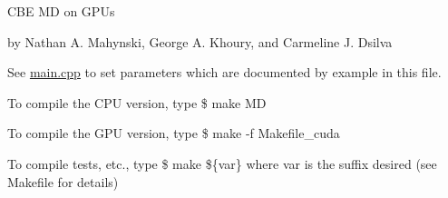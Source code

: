 C\-B\-E M\-D on G\-P\-Us

by Nathan A. Mahynski, George A. Khoury, and Carmeline J. Dsilva

See \hyperlink{main_8cpp_source}{main.\-cpp} to set parameters which are documented by example in this file.

To compile the C\-P\-U version, type \$ make M\-D

To compile the G\-P\-U version, type \$ make -\/f Makefile\-\_\-cuda

To compile tests, etc., type \$ make \$\{var\} where var is the suffix desired (see Makefile for details) 